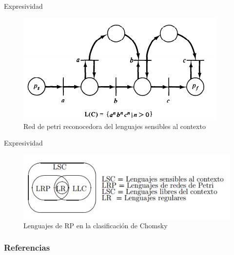 \documentclass[
compress,
xcolor=table,
dvipsnames,
]{beamer}
\begin{document}
\begin{frame}{Expresividad}
    \begin{figure}[h]
        \includegraphics[scale=0.7]{graphics/rp_context_sensitive.png}
        \caption{Red de petri reconocedora del lenguajes sensibles al contexto \citep{Peterson:81}}
    \end{figure}
\end{frame}


\begin{frame}{Expresividad}
    \begin{figure}[h]
        \includegraphics[scale=0.6]{graphics/rp_chomsky.png}
        \caption{Lenguajes de RP en la clasificación de Chomsky \citep{Augusto:95}}
    \end{figure}
\end{frame}



  
%
\begin{frame}
\frametitle{Referencias}

\insertBib

\end{frame}
\end{document}
